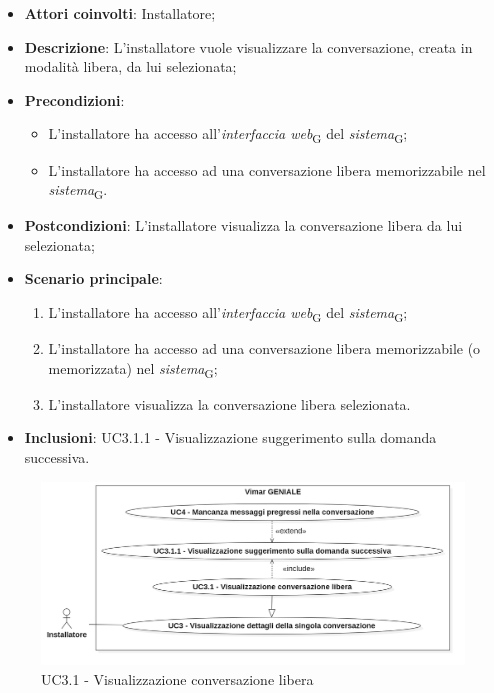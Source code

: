 \begin{itemize}
    \item \textbf{Attori coinvolti}: Installatore;
    \item \textbf{Descrizione}: L'installatore vuole visualizzare la conversazione, creata in modalità libera, da lui selezionata;
    \item \textbf{Precondizioni}: 
    \begin{itemize}
        \item L’installatore ha accesso all’\textit{interfaccia web}\textsubscript{G} del \textit{sistema}\textsubscript{G};
        \item L’installatore ha accesso ad una conversazione libera memorizzabile nel \textit{sistema}\textsubscript{G}.
    \end{itemize}
    \item \textbf{Postcondizioni}: L'installatore visualizza la conversazione libera da lui selezionata;
    \item \textbf{Scenario principale}:
    \begin{enumerate}
        \item L’installatore ha accesso all’\textit{interfaccia web}\textsubscript{G} del \textit{sistema}\textsubscript{G};
        \item L’installatore ha accesso ad una conversazione libera memorizzabile (o memorizzata) nel \textit{sistema}\textsubscript{G};
        \item L'installatore visualizza la conversazione libera selezionata.
    \end{enumerate}
    \item \textbf{Inclusioni}: UC3.1.1 - Visualizzazione suggerimento sulla domanda successiva.
\end{itemize}
\begin{figure}[H]
\centering
\includegraphics[width=1\textwidth]{contents/casi_duso/png/UC3.1.png}
\caption{UC3.1 - Visualizzazione conversazione libera}
\end{figure}

